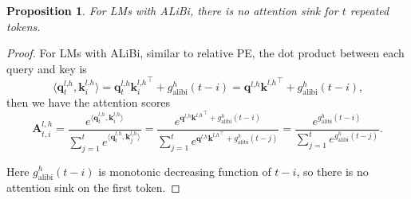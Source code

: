 \documentclass{article} \usepackage{iclr2025_conference,times}
\newtheorem{proposition}{Proposition}
\begin{document}
\begin{proposition}\label{prop3}
    For LMs with ALiBi, there is no attention sink for $t$ repeated tokens.
\end{proposition}
\begin{proof}
    For LMs with ALiBi, similar to relative PE, the dot product between each query and key is
\begin{equation}
\langle\boldsymbol{q}_t^{l\textrm{,}h}\textrm{,}\,\boldsymbol{k}_i^{l\textrm{,}h}\rangle=\boldsymbol{q}_t^{l\textrm{,}h}{\boldsymbol{k}_i^{l\textrm{,}h}}^\top + g_{\textrm{alibi}}^h(t-i)=\boldsymbol{q}^{l\textrm{,}h}{\boldsymbol{k}^{l\textrm{,}h}}^\top + g_{\textrm{alibi}}^h(t-i)\textrm{,}
\end{equation}
then we have the attention scores
\begin{equation}
\boldsymbol{A}_{t\textrm{,}\,i}^{l\textrm{,}\,h}=\frac{e^{\langle\boldsymbol{q}_t^{l\textrm{,}h}\textrm{,}\,\boldsymbol{k}_i^{l\textrm{,}h}\rangle}}{\sum_{j=1}^t e^{\langle\boldsymbol{q}_t^{l\textrm{,}h}\textrm{,}\,\boldsymbol{k}_j^{l\textrm{,}h}\rangle}}=\frac{e^{\boldsymbol{q}^{l\textrm{,}h}{\boldsymbol{k}^{l\textrm{,}h}}^\top+g_{\textrm{alibi}}^h(t-i)}}{\sum_{j=1}^te^{\boldsymbol{q}^{l\textrm{,}h}{\boldsymbol{k}^{l\textrm{,}h}}^\top+g_{\textrm{alibi}}^h(t-j)}}=\frac{e^{g_{\textrm{alibi}}^h(t-i)}}{\sum_{j=1}^te^{g_{\textrm{alibi}}^h(t-j)}}\textrm{.}
\end{equation}

Here $g_{\textrm{alibi}}^h(t-i)$ is monotonic decreasing function of $t-i$, so there is no attention sink on the first token. 
\end{proof}
\end{document}
